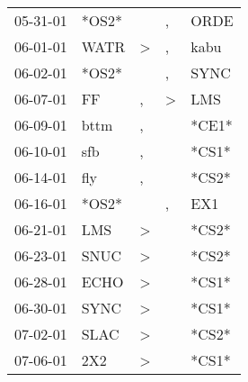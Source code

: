 \begin{supertabular}{p{0.07\textwidth}p{0.06\textwidth}p{0.02\textwidth}p{0.02\textwidth}p{0.06\textwidth}}
 05-31-01\textsuperscript{} &                            *OS2* &                  &             , &           ORDE\textsuperscript{} \\
 06-01-01\textsuperscript{} &           WATR\textsuperscript{} &     \textgreater &             , &           kabu\textsuperscript{} \\
 06-02-01\textsuperscript{} &                            *OS2* &                  &             , &           SYNC\textsuperscript{} \\
 06-07-01\textsuperscript{} &             FF\textsuperscript{} &                , &  \textgreater &            LMS\textsuperscript{} \\
 06-09-01\textsuperscript{} &           bttm\textsuperscript{} &                , &               &                            *CE1* \\
 06-10-01\textsuperscript{} &            sfb\textsuperscript{} &                , &               &                            *CS1* \\
 06-14-01\textsuperscript{} &            fly\textsuperscript{} &                , &               &                            *CS2* \\
 06-16-01\textsuperscript{} &                            *OS2* &                  &             , &            EX1\textsuperscript{} \\
 06-21-01\textsuperscript{} &            LMS\textsuperscript{} &     \textgreater &               &                            *CS2* \\
 06-23-01\textsuperscript{} &           SNUC\textsuperscript{} &     \textgreater &               &                            *CS2* \\
 06-28-01\textsuperscript{} &           ECHO\textsuperscript{} &     \textgreater &               &                            *CS1* \\
 06-30-01\textsuperscript{} &           SYNC\textsuperscript{} &     \textgreater &               &                            *CS1* \\
 07-02-01\textsuperscript{} &           SLAC\textsuperscript{} &     \textgreater &               &                            *CS2* \\
 07-06-01\textsuperscript{} &            2X2\textsuperscript{} &     \textgreater &               &                            *CS1* \\

\end{supertabular}
